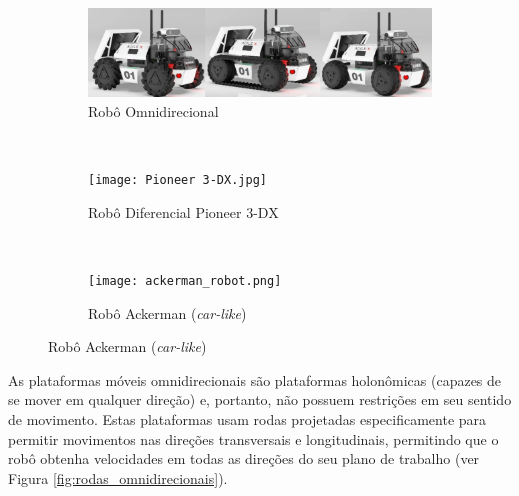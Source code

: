 \begin{figure}[htb]
    \centering
    \caption{Tipos de Robôs Móveis Terrestres.}
    \label{fig:mobile_robot_types}

    \begin{subfigure}[b]{0.3\textwidth}
        \includegraphics[trim=0 0 528 0, clip,  width=\textwidth]{img/Limo_modes.png}
        \caption{Robô Omnidirecional}
    \end{subfigure}
    ~
    \begin{subfigure}[b]{0.3\textwidth}
        \texttt{[image: Pioneer 3-DX.jpg]}
        \caption{Robô Diferencial Pioneer 3-DX}
    \end{subfigure}
    ~
    \begin{subfigure}[b]{0.3\textwidth}
        \texttt{[image: ackerman\_robot.png]}
        \caption{Robô Ackerman (\textit{car-like})}
    \end{subfigure}
    
\end{figure}


%  

As plataformas móveis omnidirecionais são plataformas holonômicas (capazes de se mover em qualquer direção) e, portanto, não possuem restrições em seu sentido de movimento. Estas plataformas usam rodas projetadas especificamente para permitir movimentos nas direções transversais e longitudinais, permitindo que o robô obtenha velocidades em todas as direções do seu plano de trabalho (ver Figura \ref{fig:rodas_omnidirecionais}).

